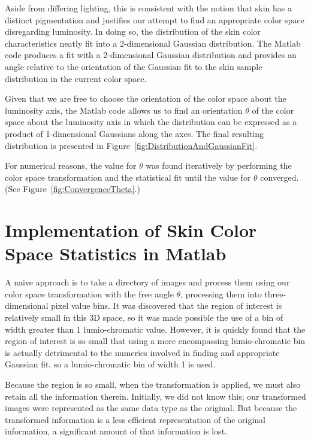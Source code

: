 Aside from differing lighting, this is consistent with the notion that skin has a distinct pigmentation and justifies our attempt to find an appropriate color space disregarding luminosity. In doing so, the distribution of the skin color characteristics neatly fit into a 2-dimensional Gaussian distribution. The Matlab code produces a fit with a 2-dimensional Gaussian distribution and provides an angle relative to the orientation of the Gaussian fit to the skin sample distribution in the current color space.

Given that we are free to choose the orientation of the color space about the luminosity axis, the Matlab code allows us to find an orientation $\theta$ of the color space about the luminosity axis in which the distribution can be expressed as a product of 1-dimensional Gaussians along the axes. The final resulting distribution is presented in Figure~\ref{fig:DistributionAndGaussianFit}.

For numerical reasons, the value for $\theta$ was found iteratively by performing the color space transformation and the statistical fit until the value for $\theta$ converged. (See Figure~\ref{fig:ConvergenceTheta}.)


\section{Implementation of Skin Color Space Statistics in Matlab}\label{sec:SkinColorSpaceStatsMatlab}

A naive approach is to take a directory of images and process them using our color space transformation with the free angle $\theta$, processing them into three-dimensional pixel value bins. It was discovered that the region of interest is relatively small in this 3D space, so it was made possible the use of a bin of width greater than 1 lumio-chromatic value. However, it is quickly found that the region of interest is so small that using a more encompassing lumio-chromatic bin is actually detrimental to the numerics involved in finding and appropriate Gaussian fit, so a lumio-chromatic bin of width 1 is used.

Because the region is so small, when the transformation is applied, we must also retain all the information therein. Initially, we did not know this; our transformed images were represented as the same data type as the original. But because the transformed information is a less efficient representation of the original information, a significant amount of that information is lost.

